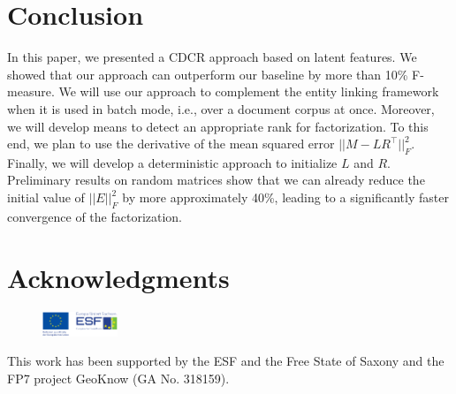 \documentclass{llncs}
\begin{document}

\section{Conclusion}
\label{sec:conclusion}
In this paper, we presented a CDCR approach based on latent features.
We showed that our approach can outperform our baseline by more than 10\% F-measure.
We will use our approach to complement the entity linking framework~\cite{AGDISTIS_ISWC} when it is used in batch mode, i.e., over a document corpus at once.
Moreover, we will develop means to detect an appropriate rank for factorization.
To this end, we plan to use the derivative of the mean squared error $||M - LR^{\top}||^2_F$.
Finally, we will develop a deterministic approach to initialize $L$ and $R$. 
Preliminary results on random matrices show that we can already reduce the initial value of $||E||^2_F$ by more approximately 40\%, leading to a significantly faster convergence of the factorization.

\section*{Acknowledgments}
\begin{figure}
 \vspace{-8mm}
 \includegraphics[width=0.20\textwidth]{esf.pdf}
\end{figure}
This work has been supported by the ESF and the Free State of Saxony and the FP7 project GeoKnow (GA No. 318159).




\end{document}
